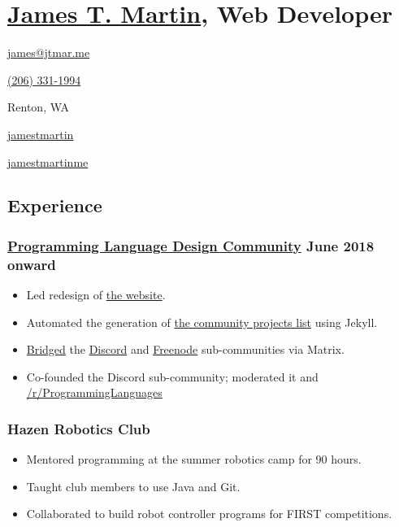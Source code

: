 \documentclass[12pt]{extarticle}
\author{James T. Martin}
\begin{document}
\section{\href{https://jamestmartin.me}{James T. Martin}, Web Developer}
\begin{description}[noitemsep,labelwidth=2cm]
\item[Email] \href{mailto:James\%20Martin<james@jtmar.me>}{james@jtmar.me}
\item[Phone] \href{tel:+1-206-331-1994}{(206) 331-1994}
\item[Location] Renton, WA
\item[GitHub] \href{https://github.com/jamestmartin}{jamestmartin}
\item[LinkedIn] \href{https://www.linkedin.com/in/jamestmartinme/}{jamestmartinme}
\end{description}

\subsection{Experience}
\subsubsection{\href{https://proglangdesign.net}{Programming Language Design Community} \hfill June 2018 onward}
\begin{itemize}
\item Led redesign of \href{https://proglangdesign.net}{the website}.
\item Automated the generation of \href{https://proglangdesign.net/#projects}{the community projects list} using Jekyll.
\item \href{https://github.com/proglangdesign/matrix.proglangdesign.net}{Bridged} the \href{https://discord.gg/4Kjt3ZE}{Discord} and \href{https://irc.lc/freenode/proglangdesign}{Freenode} sub-communities via Matrix.
\item Co-founded the Discord sub-community; moderated it and \href{https://reddit.com/r/ProgrammingLanguages}{/r/ProgrammingLanguages}
\end{itemize}

\subsubsection{Hazen Robotics Club}
\begin{itemize}
\item Mentored programming at the summer robotics camp for 90 hours.
\item Taught club members to use Java and Git.
\item Collaborated to build robot controller programs for FIRST competitions.
\end{itemize}
\end{document}
